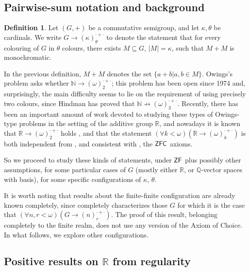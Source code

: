 \documentclass[10pt,a4paper]{amsart}
\theoremstyle{definition}
\newtheorem{definition}[theorem]{Definition}
\newcommand{\zf}{\mathnormal{\mathsf{ZF}}}
\newcommand{\zfc}{\mathnormal{\mathsf{ZFC}}}
\theoremstyle{remark}
\numberwithin{equation}{section}
\begin{document}
\subsection{Pairwise-sum notation and background}\label{subsec:owings-background}

\begin{definition}\label{def:owings-property}
Let $(G,+)$ be a commutative semigroup, and let $\kappa,\theta$ be cardinals. 
We write $G\to(\kappa)^{\cdot+\cdot}_{\theta}$ to denote the statement that for every colouring of $G$ in $\theta$ colours, there exists $M\subseteq G$, $|M|=\kappa$, such that $M+M$ is monochromatic.
\end{definition}

In the previous definition, $M+M$ denotes the set $\{a+b\big|a,b\in M\}$. Owings's problem \cite{Owings1974} asks whether $\mathbb N\to(\omega)^{\cdot+\cdot}_{2}$; this problem has been open since 1974 and, surprisingly, the main difficulty seems to lie on the requirement of using precisely two colours, since Hindman \cite{Hindman1979} has proved that $\mathbb N\nrightarrow(\omega)^{\cdot+\cdot}_{3}$. Recently, there has been an important amount of work devoted to studying these types of Owings-type problems in the setting of the additive group $\mathbb R$, and nowadays it is known that $\mathbb R\to(\omega)^{\cdot+\cdot}_{2}$ holds \cite{Zhang2020}, and that the statement $(\forall k<\omega)(\mathbb R\to (\omega)^{\cdot+\cdot}_{k})$ is both independent from \cite{HindmanLeaderStrauss2017}, and consistent with \cite{KomjathLeaderRussellShelahSoukupVidnyanszky2019,Zhang2020}, the $\zfc$ axioms.

So we proceed to study these kinds of statements, under $\zf$ plus possibly other assumptions, for some particular cases of $G$ (mostly either $\mathbb R$, or $\mathbb Q$-vector spaces with basis), for some specific configurations of $\kappa$, $\theta$.

It is worth noting that results about the finite-finite configuration are already known completely, since \cite[Theorem 1]{FernandezSarmientoVera2024} completely characterizes those $G$ for which it is the case that 
$(\forall n,r<\omega)(G\to (n)^{\cdot+\cdot}_{r})$. The proof of this result, belonging completely to the finite realm, does not use any version of the Axiom of Choice. In what follows, we explore other configurations.

\subsection{Positive results on $\mathbb{R}$ from regularity}\label{subsec:owings-reals}
\end{document}
